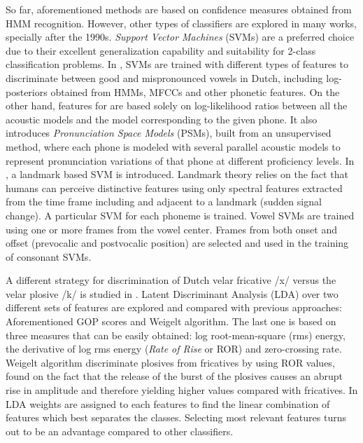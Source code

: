 So far, aforementioned methods are based on confidence measures obtained from HMM recognition. 
However, other types of classifiers are explored in many works, specially after
the 1990s. \textit{Support Vector Machines} (SVMs) are a preferred choice 
due to their excellent generalization capability and suitability for 2-class classification
problems. 
In \cite{detection_mispronunciation_dutch_vowel}, SVMs are trained with different types of
features to discriminate between good and mispronounced vowels in Dutch, including log-posteriors
obtained from HMMs, MFCCs and other phonetic features. 
On the other hand, features for \cite{svm_space_models} are based solely on
log-likelihood ratios between all the acoustic models and the model corresponding to the given
phone. It also introduces \textit{Pronunciation Space Models} (PSMs), 
built from an unsupervised method, where
each phone is modeled with several parallel acoustic models to represent pronunciation 
variations of that phone at different proficiency levels.
In \cite{landmark_svm}\cite{landmark_svm_2}, a landmark based 
SVM is introduced. Landmark theory relies on the fact that humans can perceive distinctive
features using only spectral features extracted from the time frame including and adjacent to
a landmark (sudden signal change). A particular SVM for each phoneme is trained. Vowel SVMs are 
trained using one or more frames from the vowel center. Frames from both onset and offset
(prevocalic and postvocalic position) are selected and used in the training of consonant
SVMs.

A different strategy for discrimination of Dutch velar fricative /x/ versus the velar plosive
/k/ is studied in \cite{lda_weigelt}. Latent Discriminant Analysis (LDA) over two different sets
of features are explored and compared with previous approaches: Aforementioned GOP scores and
Weigelt algorithm. The last one is based on three measures that can be easily obtained:
log root-mean-square (rms) energy, the derivative of log rms energy (\textit{Rate of Rise} or
ROR) and zero-crossing rate. Weigelt algorithm discriminate plosives from fricatives by using
ROR values, found on the fact that the release of the burst of the plosives causes an abrupt
rise in amplitude and therefore yielding higher values compared with fricatives.
In LDA weights are assigned to each features to find the linear combination of features
which best separates the classes. Selecting most relevant features turns out to be an
advantage compared to other classifiers.

